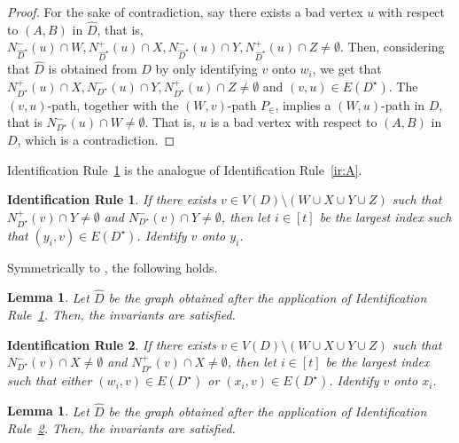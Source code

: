 \documentclass[a4paper,11pt]{article}
\theoremstyle{plain}
\newtheorem{lemma}[theorem]{Lemma}
\newtheorem{identification rule}{Identification Rule}
\theoremstyle{definition}
\theoremstyle{remark}
\begin{document}
\begin{proof}
 For the sake of contradiction, say there exists a bad vertex $u$ with respect to $(A,B)$ in $\widehat{D}$, that is, $N_{\widehat{D}^{\star}}^-(u) \cap W, N_{\widehat{D}^{\star}}^+(u) \cap X, N_{\widehat{D}^{\star}}^-(u) \cap Y, N_{\widehat{D}^{\star}}^+(u) \cap Z \neq \emptyset$. 
Then, considering that $\widehat{D}$ is obtained from $D$ by only identifying $v$ onto $w_i$, we get that
$N_{D^{\star}}^+(u) \cap X, N_{D^{\star}}^-(u) \cap Y, N_{D^{\star}}^+(u) \cap Z \neq \emptyset$ and $(v,u) \in E(D^{\star})$.  The $(v,u)$-path, together with the $(W,v)$-path $P_{\in}$, implies a $(W,u)$-path in $D$, that is $N_{D^{\star}}^-(u) \cap W \neq \emptyset$. That is, $u$ is a bad vertex with respect to $(A,B)$ in $D$, which is a contradiction.
\end{proof}

Identification Rule~\ref{ir:B} is the analogue of Identification Rule~\ref{ir:A}.

\begin{identification rule}\label{ir:B}
If there exists $v \in V(D) \setminus (W \cup X \cup Y \cup Z)$ such that $N_{D^{\star}}^+(v) \cap Y \neq \emptyset$ and $N_{D^{\star}}^-(v) \cap Y \neq \emptyset$, then let $i \in [t]$ be the largest index such that $(y_i,v) \in E(D^{\star})$. Identify $v$ onto $y_i$.
\end{identification rule}

Symmetrically to , the following holds.

\begin{lemma}\label{lem:irB-safe}
Let $\widehat{D}$ be the graph obtained after the application of Identification Rule~\ref{ir:B}. Then, the invariants are satisfied.
\end{lemma}

\begin{identification rule}\label{ir:C}
If there exists $v \in V(D) \setminus (W \cup X \cup Y \cup Z)$ such that $N_{D^{\star}}^-(v) \cap X \neq \emptyset$ and  $N_{D^{\star}}^+(v) \cap X \neq \emptyset$,
then let $i \in [t]$ be the largest index such that either $(w_i,v) \in E(D^{\star})$ or $(x_i,v) \in E(D^{\star})$. 
Identify $v$ onto $x_i$.
\end{identification rule}

\begin{lemma}\label{lem:irC-safe}
Let $\widehat{D}$ be the graph obtained after the application of Identification Rule~\ref{ir:C}. Then, the invariants are satisfied.
\end{lemma}
\end{document}
